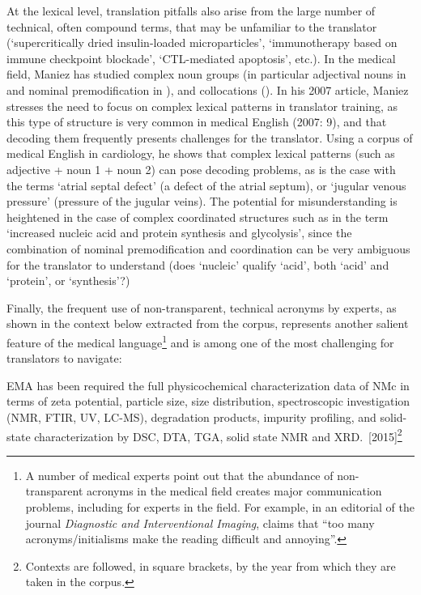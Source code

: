 \documentclass[output=paper]{langscibook}
\begin{document}
At the lexical level, translation pitfalls also arise from the large number of technical, often compound terms, that may be unfamiliar to the translator (‘supercritically dried insulin-loaded microparticles’, ‘immunotherapy based on immune checkpoint blockade’, ‘CTL-mediated apoptosis’, etc.). In the medical field, Maniez has studied complex noun groups (in particular adjectival nouns in \citeyear{Maniez2001} and nominal premodification in \citeyear{Maniez2007}), and collocations (\citeyear{Maniez2002}). In his 2007 article, Maniez stresses the need to focus on complex lexical patterns in translator training, as this type of structure is very common in medical  English (2007: 9), and that decoding them frequently presents challenges for the translator. Using a corpus of medical English in cardiology, he shows that complex lexical patterns (such as adjective + noun 1 + noun 2) can pose decoding problems, as is the case with the terms ‘atrial septal defect’ (a defect of the atrial septum), or ‘jugular venous pressure’ (pressure of the jugular veins). The potential for misunderstanding is heightened in the case of complex coordinated structures such as in the term ‘increased nucleic acid and protein synthesis and glycolysis’, since the combination of nominal premodification and coordination can be very ambiguous for the translator to understand (does ‘nucleic’ qualify ‘acid’, both ‘acid’ and ‘protein’, or ‘synthesis’?)

Finally, the frequent use of non-transparent, technical acronyms by experts, as shown in the context below extracted from the corpus, represents another salient feature of the medical language\footnote{A number of medical experts point out that the abundance of non-transparent acronyms in the medical field creates major communication problems, including for experts in the field. For example, in an editorial of the journal \textit{Diagnostic and Interventional Imaging}, \citet[590]{Soyer2018} claims that “too many acronyms/initialisms make the reading difficult and annoying”.} and is among one of the most challenging for translators to navigate:

\ea%
    \label{ex:key:1}
          EMA has been required the full physicochemical characterization data of NMc in terms of zeta potential, particle size, size distribution, spectroscopic investigation (NMR, FTIR, UV, LC-MS), degradation products, impurity profiling, and solid-state characterization by DSC, DTA, TGA, solid state NMR and XRD.~[2015]\footnote{Contexts are followed, in square brackets, by the year from which they are taken in the corpus.}
\z
\end{document}
